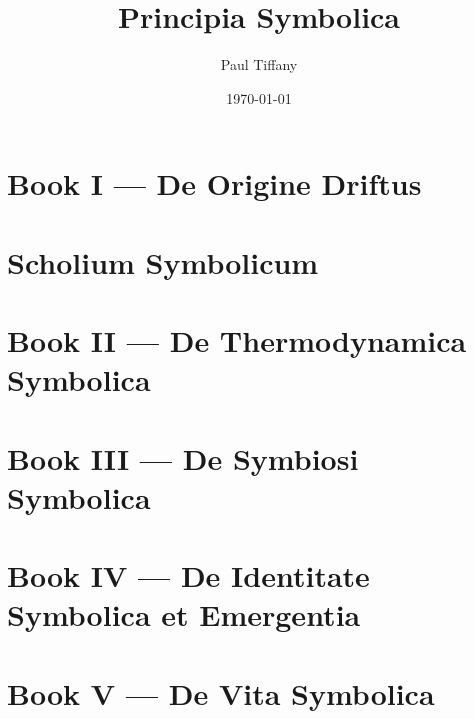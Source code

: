 \documentclass[11pt]{book}
\title{Principia Symbolica}
\author{Paul Tiffany}
\date{\today}
\theoremstyle{definition}
\theoremstyle{remark}
\theoremstyle{remark} %
\theoremstyle{plain} %
\theoremstyle{remark}
\begin{document}
\maketitle
\tableofcontents
\chapter{Book I — De Origine Driftus}
\chapter*{Scholium Symbolicum}
\chapter{Book II — De Thermodynamica Symbolica}
\chapter{Book III — De Symbiosi Symbolica}
\chapter{Book IV — De Identitate Symbolica et Emergentia}
\chapter{Book V — De Vita Symbolica}
\end{document}
